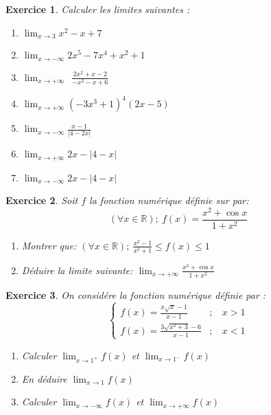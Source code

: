 \documentclass[12pt,a4paper]{article}
\newcommand{\Lim}{\displaystyle\lim}
\theoremstyle{mystyle}
\newtheorem{exo}{Exercice}
\begin{document}
\begin{multicols*}{2}
\begin{exo}
Calculer les limites suivantes :
\begin{enumerate}
    \item $\Lim_{x\to3}x^2-x+7$
    \item $\Lim_{x\to-\infty}2x^5-7x^4+x^2+1$
    \item $\Lim_{x\rightarrow +\infty} \ \ \frac{2x^{2} +x-2}{-x^{2} -x+6}$
    \item $\Lim_{x\to+\infty}(-3x^3+1)^4(2x-5)$
    \item $\Lim_{x\to-\infty}\frac{x-1}{|4-2x|}$
    \item $\Lim_{x\to+\infty}2x-|4-x|$
    \item $\Lim_{x\to-\infty}2x-|4-x|$
\end{enumerate}
\end{exo}

\begin{exo}
Soit $f$ la fonction numérique définie sur par:
$$(\forall x\in\mathbb{R});\ f(x)=\frac{x^2+\cos{x}}{1+x^2}$$
\begin{enumerate}
    \item Montrer que: $(\forall x\in\mathbb{R});\ \displaystyle\frac{x^2-1}{x^2+1}\leq f(x) \leq 1$
    \item Déduire la limite suivante: $\Lim_{x\to+\infty}\frac{x^2+\cos{x}}{1+x^2}$
\end{enumerate}
\end{exo}

\begin{exo}
    On considére la fonction numérique définie par : 
    $$\begin{cases}
f( x) =  \frac{x\sqrt{x} -1}{x-1}  &  ; \ \ \ \ x >1\\
f( x) =  \frac{3\sqrt{x^{2} +3} -6}{x-1} & ; \ \ \ \ x< 1
\end{cases}$$
\begin{enumerate}
    \item Calculer $\Lim_{x\to1^+} f(x)$ et $\Lim_{x\to1^-} f(x)$
    \item En déduire  $\Lim_{x\to 1} f(x)$
    \item Calculer $\Lim_{x\to-\infty} f(x)$ et $\Lim_{x\to+\infty} f(x)$
\end{enumerate}
\end{exo}



\end{multicols*}
\end{document}

